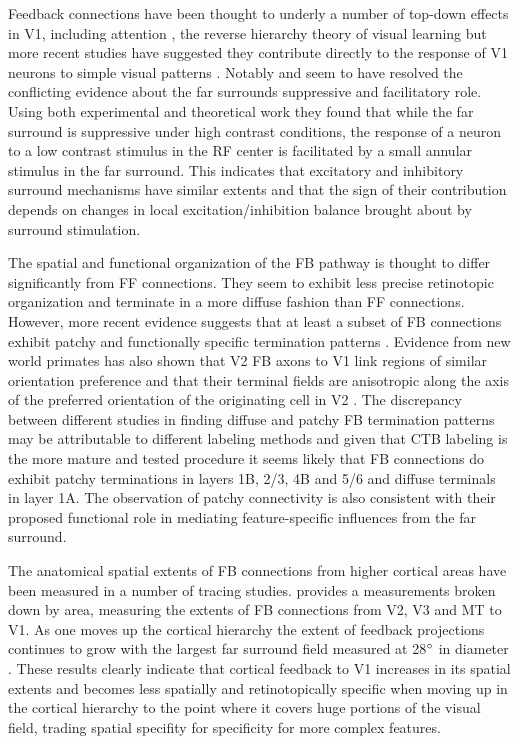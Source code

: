 Feedback connections have been thought to underly a number of top-down
effects in V1, including attention \citep{Treue2003}, the reverse
hierarchy theory of visual learning \citep{Ahissar2004} but more
recent studies have suggested they contribute directly to the response
of V1 neurons to simple visual patterns
\citep{Angelucci2002,Angelucci2003,Schwabe2006}. Notably
\cite{Schwabe2006} and \cite{Ichida2007} seem to have resolved the
conflicting evidence about the far surrounds suppressive and
facilitatory role. Using both experimental and theoretical work they
found that while the far surround is suppressive under high contrast
conditions, the response of a neuron to a low contrast stimulus in the
RF center is facilitated by a small annular stimulus in the far
surround. This indicates that excitatory and inhibitory surround
mechanisms have similar extents and that the sign of their
contribution depends on changes in local excitation/inhibition balance
brought about by surround stimulation.

The spatial and functional organization of the FB pathway is thought
to differ significantly from FF connections. They seem to exhibit less
precise retinotopic organization and terminate in a more diffuse
fashion than FF connections. However, more recent evidence suggests
that at least a subset of FB connections exhibit patchy and
functionally specific termination patterns
\citep{Angelucci2006}. Evidence from new world primates has also shown
that V2 FB axons to V1 link regions of similar orientation preference
and that their terminal fields are anisotropic along the axis of the
preferred orientation of the originating cell in V2
\citep{Shmuel2005}. The discrepancy between different studies in
finding diffuse and patchy FB termination patterns may be attributable
to different labeling methods and given that CTB labeling is the more
mature and tested procedure it seems likely that FB connections do
exhibit patchy terminations in layers 1B, 2/3, 4B and 5/6 and diffuse
terminals in layer 1A. The observation of patchy connectivity is also
consistent with their proposed functional role in mediating
feature-specific influences from the far surround.

The anatomical spatial extents of FB connections from higher cortical
areas have been measured in a number of tracing
studies. \cite{Angelucci2002} provides a measurements broken down by
area, measuring the extents of FB connections from V2, V3 and MT to
V1.  As one moves up the cortical hierarchy the extent of feedback
projections continues to grow with the largest far surround field
measured at 28$\degree$ in diameter \citep{Ichida2007}. These results
clearly indicate that cortical feedback to V1 increases in its spatial
extents and becomes less spatially and retinotopically specific when
moving up in the cortical hierarchy to the point where it covers huge
portions of the visual field, trading spatial specifity for
specificity for more complex features.

